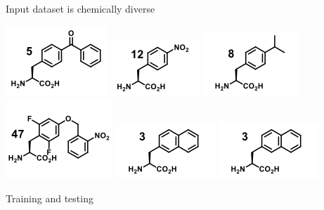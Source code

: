 \documentclass{beamer}
\begin{document}
\begin{frame}{Input dataset is chemically diverse}
\begin{center}
    \includegraphics[scale = 0.5]{uAA1.png}
    \includegraphics[scale = 0.5]{uAA2.png}
    \includegraphics[scale = 0.5]{uAA3.png}
    \\
    \includegraphics[scale = 0.5]{uAA4.png}
    \includegraphics[scale = 0.5]{uAA5.png}
    \includegraphics[scale = 0.5]{uAA6.png}
\end{center}
\end{frame}

\begin{frame}{Training and testing}
    
\end{frame}
\end{document}
